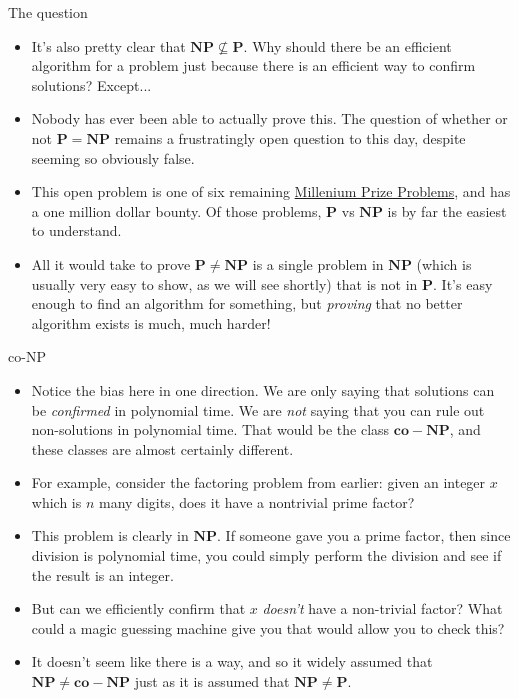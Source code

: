 \documentclass{beamer}
\begin{document}
\begin{frame}{The question}
    \begin{itemize}
        \item It's also pretty clear that $\mathbf{NP} \nsubseteq \mathbf{P}$. Why should there be an efficient algorithm for a problem just because there is an efficient way to confirm solutions? Except...
        \item Nobody has ever been able to actually prove this. The question of whether or not $\mathbf{P} = \mathbf{NP}$ remains a frustratingly open question to this day, despite seeming so obviously false. \pause 
        \item This open problem is one of six remaining \href{https://en.wikipedia.org/wiki/Millennium_Prize_Problems}{Millenium Prize Problems}, and has a one million dollar bounty. Of those problems, $\mathbf{P}$ vs $\mathbf{NP}$ is by far the easiest to understand. \pause 
        \item All it would take to prove $\mathbf{P} \neq \mathbf{NP}$ is a single problem in $\mathbf{NP}$ (which is usually very easy to show, as we will see shortly) that is not in $\mathbf{P}$. It's easy enough to find an algorithm for something, but \emph{proving} that no better algorithm exists is much, much harder! 
    \end{itemize}
\end{frame}

\begin{frame}{co-NP}
    \begin{itemize}
        \item Notice the bias here in one direction. We are only saying that solutions can be \emph{confirmed} in polynomial time. We are \emph{not} saying that you can rule out non-solutions in polynomial time. That would be the class $\mathbf{co-NP}$, and these classes are almost certainly different. 
        \item For example, consider the factoring problem from earlier: given an integer $x$ which is $n$ many digits, does it have a nontrivial prime factor?
        \item This problem is clearly in $\mathbf{NP}$. If someone gave you a prime factor, then since division is polynomial time, you could simply perform the division and see if the result is an integer. \pause 
        \item But can we efficiently confirm that $x$ \emph{doesn't} have a non-trivial factor? What could a magic guessing machine give you that would allow you to check this? \pause 
        \item It doesn't seem like there is a way, and so it widely assumed that $\mathbf{NP} \neq \mathbf{co-NP}$ just as it is assumed that $\mathbf{NP} \neq \mathbf{P}$. 
    \end{itemize}
\end{frame}
\end{document}

